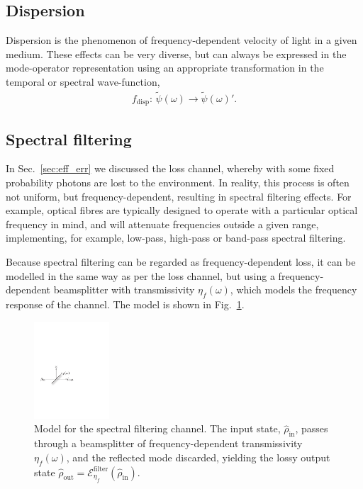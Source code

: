 %
%

\subsection{Dispersion} \label{sec:dispersion}

Dispersion is the phenomenon of frequency-dependent velocity of light in a given medium. These effects can be very diverse, but can always be expressed in the mode-operator representation using an appropriate transformation in the temporal or spectral wave-function,
\begin{align}
f_\mathrm{disp}: \,\tilde\psi(\omega)\to\tilde\psi(\omega)'.
\end{align}

%
%

\subsection{Spectral filtering} \label{sec:spectral_filt} 

In Sec.~\ref{sec:eff_err} we discussed the loss channel, whereby with some fixed probability photons are lost to the environment. In reality, this process is often not uniform, but frequency-dependent, resulting in spectral filtering effects. For example, optical fibres are typically designed to operate with a particular optical frequency in mind, and will attenuate frequencies outside a given range, implementing, for example, low-pass, high-pass or band-pass spectral filtering.

Because spectral filtering can be regarded as frequency-dependent loss, it can be modelled in the same way as per the loss channel, but using a frequency-dependent beamsplitter with transmissivity $\eta_f(\omega)$, which models the frequency response of the channel. The model is shown in Fig.~\ref{fig:spectral_filter_model}.

\begin{figure}[!htbp]
	\includegraphics[clip=true, width=0.25\textwidth]{spectral_filter_model}
	\captionspacefig \caption{Model for the spectral filtering channel. The input state, $\hat\rho_\mathrm{in}$, passes through a beamsplitter of frequency-dependent transmissivity $\eta_f(\omega)$, and the reflected mode discarded, yielding the lossy output state \mbox{$\hat\rho_\mathrm{out} = \mathcal{E}^\mathrm{filter}_{\eta_f}(\hat\rho_\mathrm{in})$}.} \label{fig:spectral_filter_model} 
\end{figure}

